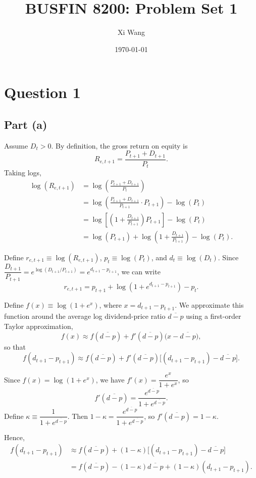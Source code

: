 \documentclass[11pt]{article}
\title{BUSFIN 8200: Problem Set 1}
\author{Xi Wang}
\date{\today}
\begin{document}
\maketitle

\section{Question 1}

\subsection{Part (a)}

Assume $D_t > 0$. By definition, the gross return on equity is
\begin{equation}
R_{e,t+1} = \frac{P_{t+1}+D_{t+1}}{P_t}.
\end{equation}
Taking logs,
\begin{align*}
\log(R_{e,t+1}) &= \log\!\left(\frac{P_{t+1}+D_{t+1}}{P_t}\right) \\
&= \log\!\left(\frac{P_{t+1}+D_{t+1}}{P_{t+1}}\cdot P_{t+1}\right) - \log(P_t) \\
&= \log\!\left[\left(1+\frac{D_{t+1}}{P_{t+1}}\right)P_{t+1}\right] - \log(P_t) \\
&= \log(P_{t+1}) + \log\!\left(1+\frac{D_{t+1}}{P_{t+1}}\right) - \log(P_t).
\end{align*}

Define $r_{e,t+1} \equiv \log(R_{e,t+1})$, $p_t \equiv \log(P_t)$, and $d_t \equiv \log(D_t)$.
Since $\dfrac{D_{t+1}}{P_{t+1}} = e^{\log(D_{t+1}/P_{t+1})} = e^{d_{t+1}-p_{t+1}}$, we can write
\[
r_{e,t+1} = p_{t+1} + \log\!\left(1+e^{d_{t+1}-p_{t+1}}\right) - p_t.
\]

Define $f(x) \equiv \log(1+e^{x})$, where $x = d_{t+1}-p_{t+1}$. We approximate this function
around the average log dividend-price ratio $\overline{d-p}$ using a first-order Taylor
approximation,
\[
f(x) \approx f(\overline{d-p}) + f'(\overline{d-p})\big(x-\overline{d-p}\big),
\]
so that
\[
f(d_{t+1}-p_{t+1}) \approx f(\overline{d-p}) + f'(\overline{d-p})\Big[(d_{t+1}-p_{t+1}) - \overline{d-p}\Big].
\]

Since $f(x) = \log(1+e^{x})$, we have $f'(x) = \dfrac{e^{x}}{1+e^{x}}$, so
\[
f'(\overline{d-p}) = \frac{e^{\overline{d-p}}}{1+e^{\overline{d-p}}}.
\]
Define $\kappa \equiv \dfrac{1}{1+e^{\overline{d-p}}}$. Then $1-\kappa = \dfrac{e^{\overline{d-p}}}{1+e^{\overline{d-p}}}$, so $f'(\overline{d-p}) = 1-\kappa$.

Hence,
\begin{align*}
f(d_{t+1}-p_{t+1}) &\approx f(\overline{d-p}) + (1-\kappa)\Big[(d_{t+1}-p_{t+1}) - \overline{d-p}\Big] \\
&= f(\overline{d-p}) - (1-\kappa)\overline{d-p} + (1-\kappa)(d_{t+1}-p_{t+1}).
\end{align*}
\end{document}
